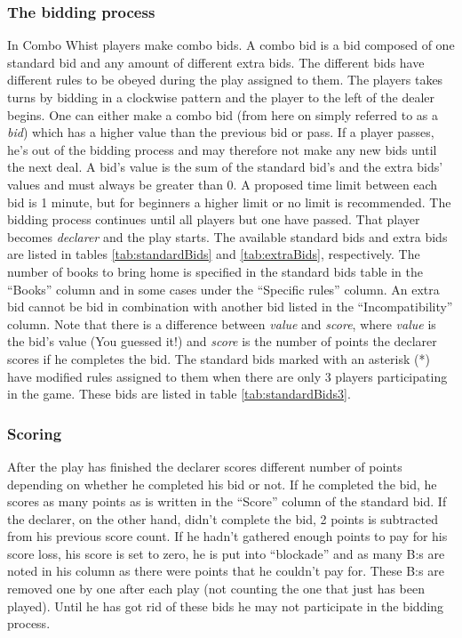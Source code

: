 \documentclass[a4paper]{article}
\begin{document}
			\subsubsection{The bidding process}
			In Combo Whist players make combo bids. A combo bid is a bid composed of one standard bid and any amount of different extra bids. The different bids have different rules to be obeyed during the play assigned to them. The players takes turns by bidding in a clockwise pattern and the player to the left of the dealer begins. One can either make a combo bid (from here on simply referred to as a \emph{bid}) which has a higher value than the previous bid or pass. If a player passes, he's out of the bidding process and may therefore not make any new bids until the next deal. A bid's value is the sum of the standard bid's and the extra bids' values and must always be greater than 0. A proposed time limit between each bid is 1 minute, but for beginners a higher limit or no limit is recommended. The bidding process continues until all players but one have passed. That player becomes \emph{declarer} and the play starts. The available standard bids and extra bids are listed in tables \ref{tab:standardBids} and \ref{tab:extraBids}, respectively. The number of books to bring home is specified in the standard bids table in the ``Books'' column and in some cases under the ``Specific rules'' column. An extra bid cannot be bid in combination with another bid listed in the ``Incompatibility'' column. Note that there is a difference between \emph{value} and \emph{score}, where \emph{value} is the bid's value (You guessed it!) and \emph{score} is the number of points the declarer scores if he completes the bid. The standard bids marked with an asterisk (*) have modified rules assigned to them when there are only 3 players participating in the game. These bids are listed in table \ref{tab:standardBids3}.
			
			
			
			
			\subsubsection{Scoring}
			After the play has finished the declarer scores different number of points depending on whether he completed his bid or not. If he completed the bid, he scores as many points as is written in the ``Score'' column of the standard bid. If the declarer, on the other hand, didn't complete the bid, 2 points is subtracted from his previous score count. If he hadn't gathered enough points to pay for his score loss, his score is set to zero, he is put into ``blockade'' and as many B:s are noted in his column as there were points that he couldn't pay for. These B:s are removed one by one after each play (not counting the one that just has been played). Until he has got rid of these bids he may not participate in the bidding process.
			
\end{document}
